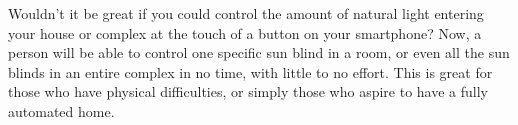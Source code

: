 Wouldn't it be great if you could control the amount of natural light entering your house or complex at the touch of a button on your smartphone? Now, a person will be able to control one specific sun blind in a room, or even all the sun blinds in an entire complex in no time, with little to no effort. This is great for those who have physical difficulties, or simply those who aspire to have a fully automated home.